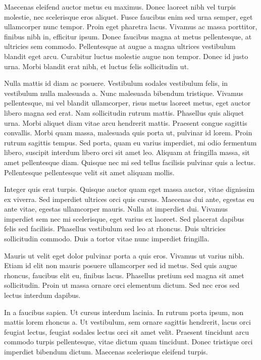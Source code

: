 Maecenas eleifend auctor metus eu maximus. Donec laoreet nibh vel turpis molestie, nec scelerisque eros aliquet. Fusce faucibus enim sed urna semper, eget ullamcorper nunc tempor. Proin eget pharetra lacus. Vivamus ac massa porttitor, finibus nibh in, efficitur ipsum. Donec faucibus magna at metus pellentesque, at ultricies sem commodo. Pellentesque at augue a magna ultrices vestibulum blandit eget arcu. Curabitur luctus molestie augue non tempor. Donec id justo urna. Morbi blandit erat nibh, et luctus felis sollicitudin ut.

Nulla mattis id diam ac posuere. Vestibulum sodales vestibulum felis, in vestibulum nulla malesuada a. Nunc malesuada bibendum tristique. Vivamus pellentesque, mi vel blandit ullamcorper, risus metus laoreet metus, eget auctor libero magna sed erat. Nam sollicitudin rutrum mattis. Phasellus quis aliquet urna. Morbi aliquet diam vitae arcu hendrerit mattis. Praesent congue sagittis convallis. Morbi quam massa, malesuada quis porta ut, pulvinar id lorem. Proin rutrum sagittis tempus. Sed porta, quam eu varius imperdiet, mi odio fermentum libero, suscipit interdum libero orci sit amet leo. Aliquam at fringilla massa, sit amet pellentesque diam. Quisque nec mi sed tellus facilisis pulvinar quis a lectus. Pellentesque pellentesque velit sit amet aliquam mollis.

Integer quis erat turpis. Quisque auctor quam eget massa auctor, vitae dignissim ex viverra. Sed imperdiet ultrices orci quis cursus. Maecenas dui ante, egestas eu ante vitae, egestas ullamcorper mauris. Nulla at imperdiet dui. Vivamus imperdiet sem nec mi scelerisque, eget varius ex laoreet. Sed placerat dapibus felis sed facilisis. Phasellus vestibulum sed leo at rhoncus. Duis ultricies sollicitudin commodo. Duis a tortor vitae nunc imperdiet fringilla.

Mauris ut velit eget dolor pulvinar porta a quis eros. Vivamus ut varius nibh. Etiam id elit non mauris posuere ullamcorper sed id metus. Sed quis augue rhoncus, faucibus elit eu, finibus lacus. Phasellus pretium sed magna sit amet sollicitudin. Proin ut massa ornare orci elementum dictum. Sed nec eros sed lectus interdum dapibus.

In a faucibus sapien. Ut cursus interdum lacinia. In rutrum porta ipsum, non mattis lorem rhoncus a. Ut vestibulum, sem ornare sagittis hendrerit, lacus orci feugiat lectus, feugiat sodales lectus orci sit amet velit. Praesent tincidunt arcu commodo turpis pellentesque, vitae dictum quam tincidunt. Donec tristique orci imperdiet bibendum dictum. Maecenas scelerisque eleifend turpis.


